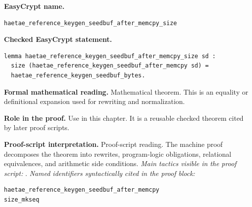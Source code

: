 \begin{formaltheorem}
\noindent\textbf{EasyCrypt name.}
\begin{lstlisting}[language=EasyCrypt,basicstyle=\ttfamily\scriptsize]
haetae_reference_keygen_seedbuf_after_memcpy_size
\end{lstlisting}
\noindent\textbf{Checked EasyCrypt statement.}
\begin{lstlisting}[language=EasyCrypt,basicstyle=\ttfamily\scriptsize]
lemma haetae_reference_keygen_seedbuf_after_memcpy_size sd :
  size (haetae_reference_keygen_seedbuf_after_memcpy sd) =
  haetae_reference_keygen_seedbuf_bytes.
\end{lstlisting}
\noindent\textbf{Formal mathematical reading.}
Mathematical theorem. This is an equality or definitional expansion used for rewriting and normalization.

\noindent\textbf{Role in the proof.}
Use in this chapter. It is a reusable checked theorem cited by later proof scripts.

\noindent\textbf{Proof-script interpretation.}
Proof-script reading. The machine proof decomposes the theorem into rewrites, program-logic obligations, relational equivalences, and arithmetic side conditions.
\emph{Main tactics visible in the proof script:} .
\emph{Named identifiers syntactically cited in the proof block:}
\begin{lstlisting}[language=EasyCrypt,basicstyle=\ttfamily\scriptsize]
haetae_reference_keygen_seedbuf_after_memcpy
size_mkseq
\end{lstlisting}

\end{formaltheorem}

